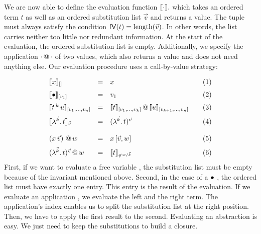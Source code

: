 \documentclass[submission,copyright,creativecommons]{eptcs}
\begin{document}
We are now able to define the evaluation function $\llbracket{\cdot}\rrbracket_{\cdot}$ which takes an ordered term $t$ as well as an ordered substitution list $\vec v$ and returns a value. The tuple must always satisfy the condition $\mathsf{fV}(t) = \mbox{length}(\vec v)$. In other words, the list carries neither too little nor redundant information.
At the start of the evaluation, the ordered substitution list is empty. 
Additionally, we specify the application $\cdot \,@\, \cdot$ of two values, which also returns a value and does not need anything else.
Our evaluation procedure uses a call-by-value strategy:

\[ 
\begin{array}{lcl@{\qquad} r}
 \ev x {\emptyVec} & = & x & \lab 1 \\ \noalign{\medskip}
 \ev \ovar {\ve{v_1}} & = & v_1 & \lab 2\\  \noalign{\medskip}
 \ev {t \oapp k u} {\ve{v_1, \ldots, v_n}} & = & {\ev t {\ve{v_1, \ldots, v_k}}} \ap {\ev u {\ve{v_{k+1}, \ldots, v_n}}}  & \lab 3 \\  \noalign{\medskip}
 \ev {\LaO {\vec k} t}  {\vec v} & = & \Val {\vec k} t {\vec v} & \lab 4 \\  
\\ 
 \pa{x \sspace \vec v} \ap w & = & x \sspace \ve{\vec v, w}  & \lab 5
\\ \noalign{\medskip}
 \Val{\vec k} t {\vec v}   \ap w & = & \ev t {\multiinsert{\vec v}{\vec k}{w}} & \lab 6
\end{array}
\]
First, if we want to evaluate a free variable , the substitution list must be empty because of the invariant mentioned above. 
Second, in the case of a $\mathord{\bullet}$ , the ordered list must have exactly one entry. This entry is the result of the evaluation. 
If we evaluate an application , we evaluate the left and the right term. The application's index enables us to split the substitution list at the right position. Then, we have to apply the first result to the second. 
Evaluating an abstraction  is easy. We just need to keep the substitutions to build a closure. 
\end{document}
